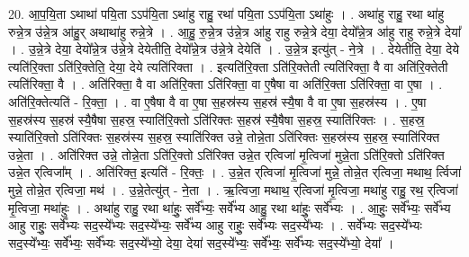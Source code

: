 \documentclass[17pt]{extarticle}
\begin{document}
20. आ॒प॒यि॒ता ऽथाथा॑ पयि॒ता ऽऽप॑यि॒ता ऽथा॑हु राहु॒ रथा॑ पयि॒ता ऽऽप॑यि॒ता ऽथा॑हुः । . अथा॑हु राहु॒ रथा था॑हु रुन्ने॒त्र उ॑न्ने॒त्र आ॑हु॒र् अथाथा॑हु रुन्ने॒त्रे । . आ॒हु॒ रु॒न्ने॒त्र उ॑न्ने॒त्र आ॑हु राहु रुन्ने॒त्रे देया॒ देयो᳚न्ने॒त्र आ॑हु राहु रुन्ने॒त्रे देया᳚ । . उ॒न्ने॒त्रे देया॒ देयो᳚न्ने॒त्र उ॑न्ने॒त्रे देयेतीति॒ देयो᳚न्ने॒त्र उ॑न्ने॒त्रे देयेति॑ । . उ॒न्ने॒त्र इत्यु॑त् - ने॒त्रे । . देयेतीति॒ देया॒ देये त्यति॑रि॒क्ता ऽति॑रि॒क्तेति॒ देया॒ देये त्यति॑रिक्ता । . इत्यति॑रि॒क्ता ऽति॑रि॒क्तेती त्यति॑रिक्ता॒ वै वा अति॑रि॒क्तेती त्यति॑रिक्ता॒ वै । . अति॑रिक्ता॒ वै वा अति॑रि॒क्ता ऽति॑रिक्ता॒ वा ए॒षैषा वा अति॑रि॒क्ता ऽति॑रिक्ता॒ वा ए॒षा । . अति॑रि॒क्तेत्यति॑ - रि॒क्ता॒ । . वा ए॒षैषा वै वा ए॒षा स॒हस्र॑स्य स॒हस्र॑ स्यै॒षा वै वा ए॒षा स॒हस्र॑स्य । . ए॒षा स॒हस्र॑स्य स॒हस्र॑ स्यै॒षैषा स॒हस्र॒ स्याति॑रि॒क्तो ऽति॑रिक्तः स॒हस्र॑ स्यै॒षैषा स॒हस्र॒ स्याति॑रिक्तः । . स॒हस्र॒ स्याति॑रि॒क्तो ऽति॑रिक्तः स॒हस्र॑स्य स॒हस्र॒ स्याति॑रिक्त उन्ने॒ तोन्ने॒ता ऽति॑रिक्तः स॒हस्र॑स्य स॒हस्र॒ स्याति॑रिक्त उन्ने॒ता । . अति॑रिक्त उन्ने॒ तोन्ने॒ता ऽति॑रि॒क्तो ऽति॑रिक्त उन्ने॒त र्‌त्विजा॑ मृ॒त्विजा॑ मुन्ने॒ता ऽति॑रि॒क्तो ऽति॑रिक्त उन्ने॒त र्‌त्विजा᳚म् । . अति॑रिक्त॒ इत्यति॑ - रि॒क्तः॒ । . उ॒न्ने॒त र्‌त्विजा॑ मृ॒त्विजा॑ मुन्ने॒ तोन्ने॒त र्‌त्विजा॒ मथाथ॒ र्त्विजा॑ मुन्ने॒ तोन्ने॒त र्‌त्विजा॒ मथ॑ । . उ॒न्ने॒तेत्यु॑त् - ने॒ता । . ऋ॒त्विजा॒ मथाथ॒ र्‌त्विजा॑ मृ॒त्विजा॒ मथा॑हु राहु॒ रथ॒ र्‌त्विजा॑ मृ॒त्विजा॒ मथा॑हुः । . अथा॑हु राहु॒ रथा था॑हुः॒ सर्वे᳚भ्यः॒ सर्वे᳚भ्य आहु॒ रथा था॑हुः॒ सर्वे᳚भ्यः । . आ॒हुः॒ सर्वे᳚भ्यः॒ सर्वे᳚भ्य आहु राहुः॒ सर्वे᳚भ्यः सद॒स्ये᳚भ्यः सद॒स्ये᳚भ्यः॒ सर्वे᳚भ्य आहु राहुः॒ सर्वे᳚भ्यः सद॒स्ये᳚भ्यः । . सर्वे᳚भ्यः सद॒स्ये᳚भ्यः सद॒स्ये᳚भ्यः॒ सर्वे᳚भ्यः॒ सर्वे᳚भ्यः सद॒स्ये᳚भ्यो॒ देया॒ देया॑ सद॒स्ये᳚भ्यः॒ सर्वे᳚भ्यः॒ सर्वे᳚भ्यः सद॒स्ये᳚भ्यो॒ देया᳚ । \newline
\end{document}
